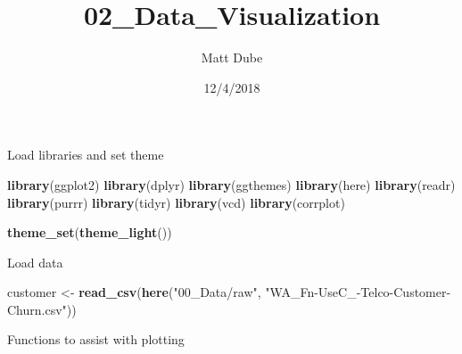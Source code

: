 \documentclass[]{article}
\title{02\_Data\_Visualization}
\author{Matt Dube}
\date{12/4/2018}
\newenvironment{Shaded}{\begin{snugshade}}{\end{snugshade}}
\newcommand{\KeywordTok}[1]{\textcolor[rgb]{0.13,0.29,0.53}{\textbf{#1}}}
\newcommand{\NormalTok}[1]{#1}
\newcommand{\StringTok}[1]{\textcolor[rgb]{0.31,0.60,0.02}{#1}}
\begin{document}
\maketitle

{
\setcounter{tocdepth}{2}
\tableofcontents
}
Load libraries and set theme

\begin{Shaded}
\begin{Highlighting}[]
\KeywordTok{library}\NormalTok{(ggplot2)}
\KeywordTok{library}\NormalTok{(dplyr)}
\KeywordTok{library}\NormalTok{(ggthemes)}
\KeywordTok{library}\NormalTok{(here)}
\KeywordTok{library}\NormalTok{(readr)}
\KeywordTok{library}\NormalTok{(purrr)}
\KeywordTok{library}\NormalTok{(tidyr)}
\KeywordTok{library}\NormalTok{(vcd)}
\KeywordTok{library}\NormalTok{(corrplot)}
\end{Highlighting}
\end{Shaded}

\begin{Shaded}
\begin{Highlighting}[]
\KeywordTok{theme_set}\NormalTok{(}\KeywordTok{theme_light}\NormalTok{())}
\end{Highlighting}
\end{Shaded}

Load data

\begin{Shaded}
\begin{Highlighting}[]
\NormalTok{customer <-}\StringTok{ }\KeywordTok{read_csv}\NormalTok{(}\KeywordTok{here}\NormalTok{(}\StringTok{"00_Data/raw"}\NormalTok{, }\StringTok{"WA_Fn-UseC_-Telco-Customer-Churn.csv"}\NormalTok{))}
\end{Highlighting}
\end{Shaded}

Functions to assist with plotting
\end{document}
